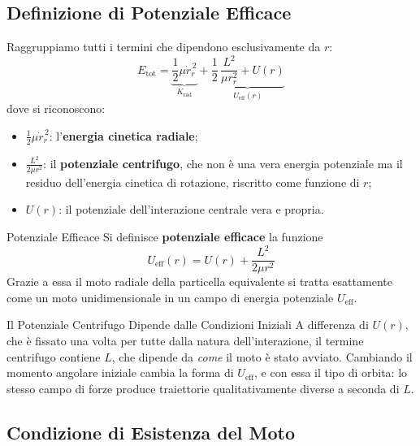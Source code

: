 \subsection{Definizione di Potenziale Efficace}

Raggruppiamo tutti i termini che dipendono esclusivamente da $r$:
\begin{equation}
    E_{\text{tot}} = \underbrace{\frac{1}{2} \mu \dot{r}_r^{\,2}}_{K_{\text{rad}}}
    + \underbrace{\frac{1}{2}\,\frac{L^2}{\mu r_r^2} + U(r)}_{U_{\text{eff}}(r)}
\end{equation}
dove si riconoscono:
\begin{itemize}
    \item $\frac{1}{2}\mu \dot{r}_r^{\,2}$: l'\textbf{energia cinetica radiale};
    \item $\frac{L^2}{2\mu r^2}$: il \textbf{potenziale centrifugo}, che non è una vera energia potenziale ma il residuo dell'energia cinetica di rotazione, riscritto come funzione di $r$;
    \item $U(r)$: il potenziale dell'interazione centrale vera e propria.
\end{itemize}

\begin{definizione}{Potenziale Efficace}
Si definisce \textbf{potenziale efficace} la funzione
\begin{equation}
    U_{\text{eff}}(r) = U(r) + \frac{L^2}{2\mu r^2}
\end{equation}
Grazie a essa il moto radiale della particella equivalente si tratta esattamente come un moto unidimensionale in un campo di energia potenziale $U_{\text{eff}}$.
\end{definizione}

\begin{attenzione}{Il Potenziale Centrifugo Dipende dalle Condizioni Iniziali}
A differenza di $U(r)$, che è fissato una volta per tutte dalla natura dell'interazione, il termine centrifugo contiene $L$, che dipende da \emph{come} il moto è stato avviato. Cambiando il momento angolare iniziale cambia la forma di $U_{\text{eff}}$, e con essa il tipo di orbita: lo stesso campo di forze produce traiettorie qualitativamente diverse a seconda di $L$.
\end{attenzione}

\subsection{Condizione di Esistenza del Moto}

